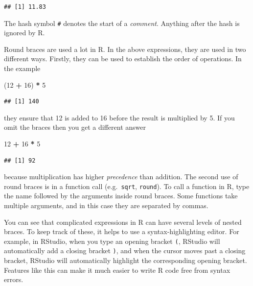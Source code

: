 \documentclass[
]{book}
\newenvironment{Shaded}{\begin{snugshade}}{\end{snugshade}}
\newcommand{\DecValTok}[1]{\textcolor[rgb]{0.00,0.00,0.81}{#1}}
\newcommand{\NormalTok}[1]{#1}
\newcommand{\SpecialCharTok}[1]{\textcolor[rgb]{0.81,0.36,0.00}{\textbf{#1}}}
\theoremstyle{definition}
\theoremstyle{definition}
\theoremstyle{definition}
\theoremstyle{definition}
\theoremstyle{remark}
\begin{document}
\begin{verbatim}
## [1] 11.83
\end{verbatim}

The hash symbol \texttt{\#} denotes the start of a \emph{comment}.
Anything after the hash is ignored by R.

Round braces are used a lot in R. In the above expressions, they are
used in two different ways. Firstly, they can be used to establish the
order of operations. In the example

\begin{Shaded}
\begin{Highlighting}[]
\NormalTok{(}\DecValTok{12} \SpecialCharTok{+} \DecValTok{16}\NormalTok{) }\SpecialCharTok{*} \DecValTok{5}
\end{Highlighting}
\end{Shaded}

\begin{verbatim}
## [1] 140
\end{verbatim}

they ensure that 12 is added to 16 before the result is multiplied by 5.
If you omit the braces then you get a different answer

\begin{Shaded}
\begin{Highlighting}[]
\DecValTok{12} \SpecialCharTok{+} \DecValTok{16} \SpecialCharTok{*} \DecValTok{5}
\end{Highlighting}
\end{Shaded}

\begin{verbatim}
## [1] 92
\end{verbatim}

because multiplication has higher \emph{precedence} than addition. The
second use of round braces is in a function call (e.g.~\texttt{sqrt},
\texttt{round}). To call a function in R, type the name followed by the
arguments inside round braces. Some functions take multiple arguments,
and in this case they are separated by commas.

You can see that complicated expressions in R can have several levels
of nested braces. To keep track of these, it helps to use a
syntax-highlighting editor. For example, in RStudio, when you type an
opening bracket \texttt{(}, RStudio will automatically add a closing
bracket \texttt{)}, and when the cursor moves past a closing bracket,
RStudio will automatically highlight the corresponding opening
bracket. Features like this can make it much easier to write R code
free from syntax errors.
\end{document}
